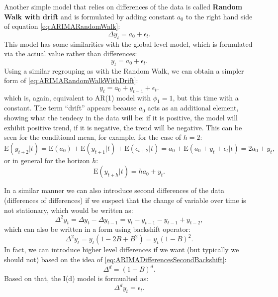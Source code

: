 \documentclass[
]{book}
\theoremstyle{definition}
\theoremstyle{definition}
\theoremstyle{definition}
\theoremstyle{definition}
\theoremstyle{remark}
\begin{document}
Another simple model that relies on differences of the data is called \textbf{Random Walk with drift} and is formulated by adding constant \(a_0\) to the right hand side of equation \eqref{eq:ARIMARandomWalk}:
\begin{equation}
  \Delta y_t = a_0 + \epsilon_t.
  \label{eq:ARIMARandomWalkWithDrift}
\end{equation}
This model has some similarities with the global level model, which is formulated via the actual value rather than differences:
\begin{equation}
  {y}_{t} = a_0 + \epsilon_t.
  \label{eq:ARIMAGlobalMean}
\end{equation}
Using a similar regrouping as with the Random Walk, we can obtain a simpler form of \eqref{eq:ARIMARandomWalkWithDrift}:
\begin{equation}
  y_t = a_0 + y_{t-1} + \epsilon_t.
  \label{eq:ARIMARandomWalkWithDrift02}
\end{equation}
which is, again, equivalent to AR(1) model with \(\phi_1=1\), but this time with a constant. The term ``drift'' appears because \(a_0\) acts as an additional element, showing what the tendecy in the data will be: if it is positive, the model will exhibit positive trend, if it is negative, the trend will be negative. This can be seen for the conditional mean, for example, for the case of \(h=2\):
\begin{equation}
  \mathrm{E}(y_{t+2}|t) = \mathrm{E}(a_0) + \mathrm{E}(y_{t+1}|t) + \mathrm{E}(\epsilon_{t+2}|t) = a_0 + \mathrm{E}(a_0 + y_t + \epsilon_t|t) = 2 a_0 + y_t ,
  \label{eq:ARIMARandomWalkWithDriftForecasth2}
\end{equation}
or in general for the horizon \(h\):
\begin{equation}
  \mathrm{E}(y_{t+h}|t) = h a_0 + y_t .
  \label{eq:ARIMARandomWalkWithDriftForecasth}
\end{equation}

In a similar manner we can also introduce second differences of the data (differences of differences) if we suspect that the change of variable over time is not stationary, which would be written as:
\begin{equation}
  \Delta^2 y_t = \Delta y_t - \Delta y_{t-1} = y_t - y_{t-1} - y_{t-1} + y_{t-2},
  \label{eq:ARIMADifferencesSecond}
\end{equation}
which can also be written in a form using backshift operator:
\begin{equation}
  \Delta^2 y_t = y_t(1 - 2B + B^2) = y_t (1-B)^2.
  \label{eq:ARIMADifferencesSecondBackshift}
\end{equation}
In fact, we can introduce higher level differences if we want (but typically we should not) based on the idea of \eqref{eq:ARIMADifferencesSecondBackshift}:
\begin{equation}
  \Delta^d = (1-B)^d.
  \label{eq:ARIMADifferences}
\end{equation}
Based on that, the I(d) model is formualted as:
\begin{equation}
  \Delta^d y_t = \epsilon_t.
  \label{eq:ARIMA0d0}
\end{equation}
\end{document}
